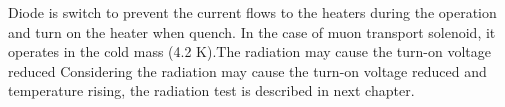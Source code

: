 Diode is switch to prevent the current flows to the heaters during the operation and turn on the heater when quench.
In the case of muon transport solenoid, it operates in the cold mass (4.2 K).The radiation may cause the turn-on voltage reduced 
Considering the radiation may cause the turn-on voltage reduced and temperature rising, the radiation test is described in next chapter.




